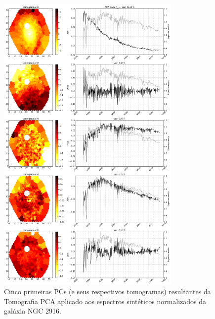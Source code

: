 \begin{figure}
    \includegraphics[width=0.8\textwidth]{figuras/K0277-tomo-syn-norm.pdf}
    \caption[Tomogramas de 1 a 5 da gal\'axia NGC 2916 - $f_{syn}$ .]
    {Cinco primeiras PCs (e seus respectivos tomogramas) resultantes da Tomografia PCA aplicado aos espectros
    sintéticos normalizados da galáxia NGC 2916.}
    \label{fig:K0277tomofsynnorm}
\end{figure}

